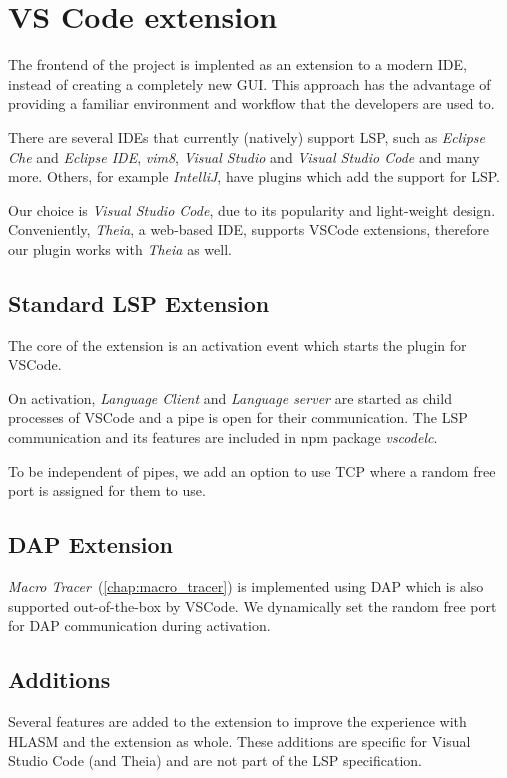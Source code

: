 \chapter{VS Code extension}

The frontend of the project is implented as an extension to a modern IDE, instead of creating a completely new GUI. This approach has the advantage of providing a familiar environment and workflow that the developers are used to.

There are several IDEs that currently (natively) support LSP, such as \emph{Eclipse Che} and \emph{Eclipse IDE}, \emph{vim8}, \emph{Visual Studio} and \emph{Visual Studio Code} and many more. Others, for example \emph{IntelliJ}, have plugins which add the support for LSP.

Our choice is \emph{Visual Studio Code}, due to its popularity and light-weight design. Conveniently, \emph{Theia}, a web-based IDE, supports VSCode extensions, therefore our plugin works with \emph{Theia} as well.

\section{Standard LSP Extension}

The core of the extension is an activation event which starts the plugin for VSCode.

On activation, \emph{Language Client} and \emph{Language server} are started as child processes of VSCode and a pipe is open for their communication. The LSP communication and its features are included in npm package \emph{vscodelc}. 

To be independent of pipes, we add an option to use TCP where a random free port is assigned for them to use.

\section{DAP Extension}

\emph{Macro Tracer}~(\autoref{chap:macro_tracer}) is implemented using DAP which is also supported out-of-the-box by VSCode. We dynamically set the random free port for DAP communication during activation.

\section{Additions}

Several features are added to the extension to improve the experience with HLASM and the extension as whole. These additions are specific for Visual Studio Code (and Theia) and are not part of the LSP specification.


